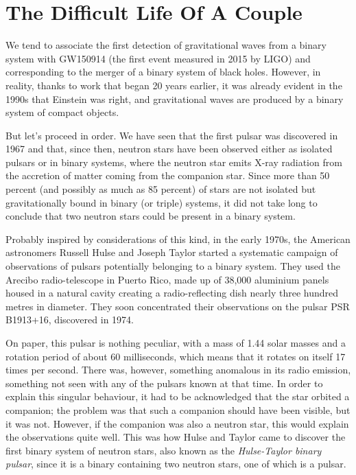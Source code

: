 \section{The Difficult Life Of A Couple}\label{sec:08-couple}

We tend to associate the first detection of gravitational waves from a binary system
with GW150914 (the first event measured in 2015 by LIGO) and
corresponding to the merger of a binary system of black holes. However, in reality,
thanks to work that began 20 years earlier, it was already evident in the 1990s that
Einstein was right, and gravitational waves are produced by a binary system of compact
objects.

But let's proceed in order. We have seen that the first pulsar was discovered in 1967
and that, since then, neutron stars have been observed either as isolated pulsars or in
binary systems, where the neutron star emits X-ray radiation from the
accretion of matter coming from the companion star. Since more than 50 percent (and
possibly as much as 85 percent) of stars are not isolated but gravitationally
bound in binary (or triple) systems, it did not take long to conclude
that two neutron stars could be present in a binary system.

Probably inspired by considerations of this kind, in the early 1970s, the American
astronomers Russell Hulse and Joseph Taylor
started a systematic campaign of observations of pulsars potentially belonging to a
binary system. They used the Arecibo radio-telescope in Puerto Rico, made up of 38,000
aluminium panels housed in a natural cavity creating a radio-reflecting dish nearly
three hundred metres in diameter. They soon concentrated their observations on the
pulsar PSR B1913+16, discovered in 1974.

On paper, this pulsar is nothing peculiar, with a mass of 1.44 solar masses and a
rotation period of about 60 milliseconds, which means that it rotates on itself 17 times
per second. There was, however, something anomalous in its radio emission, something not
seen with any of the pulsars known at that time. In order to explain this singular
behaviour, it had to be acknowledged that the star orbited a companion; the problem was
that such a companion should have been visible, but it was not. However, if the
companion was also a neutron star, this would explain the observations quite well. This
was how Hulse and Taylor came to discover the first binary system of neutron stars, also
known as the \emph{Hulse-Taylor binary pulsar}, since it is a binary containing two
neutron stars, one of which is a pulsar.

